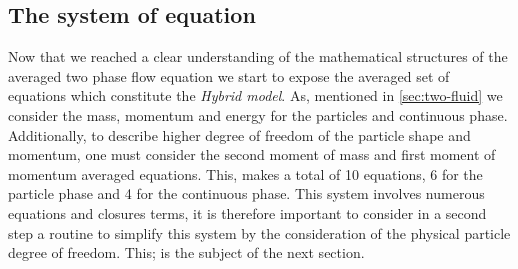 \subsection{The system of equation}
Now that we reached a clear understanding of the mathematical structures of the averaged two phase flow equation we start to expose the averaged set of equations which constitute the \textit{Hybrid model}. 
As, mentioned in \ref{sec:two-fluid} we consider the mass, momentum and energy for the particles and continuous phase. 
Additionally, to describe higher degree of freedom of the particle shape and momentum, one must consider the second moment of mass and first moment of momentum averaged equations. 
This, makes a total of 10 equations, 6 for the particle phase and 4 for the continuous phase.
This system involves numerous equations and closures terms, it is therefore important to consider in a second step a routine to simplify this system by the consideration of the physical particle degree of freedom.
This; is the subject of the next section.    


